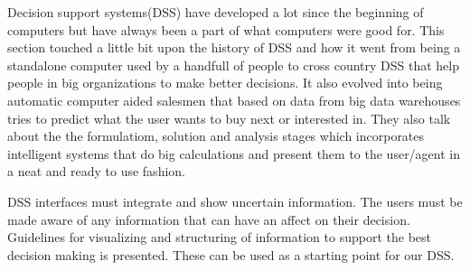 Decision support systems(DSS) have developed a lot since the beginning of computers but have always been a part of what computers were good for. This section touched a little bit upon the history of DSS and how it went from being a standalone computer used by a handfull of people to cross country DSS that help people in big organizations to make better decisions. It also evolved into being automatic computer aided salesmen that based on data from big data warehouses tries to predict what the user wants to buy next or interested in. They also talk about the the formulatiom, solution and analysis stages which incorporates intelligent systems that do big calculations and present them to the user/agent in a neat and ready to use fashion.

DSS interfaces must integrate and show uncertain information. The users must be made aware of any information that can have an affect on their decision. Guidelines for visualizing and structuring of information to support the best decision making is presented. These can be used as a starting point for our DSS.